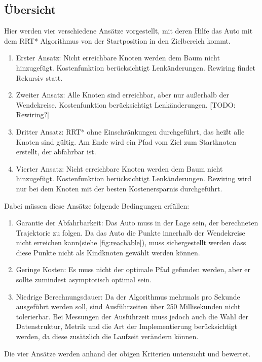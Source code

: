 \subsection{Übersicht}
\label{sec:uebersicht}
Hier werden vier verschiedene Ansätze vorgestellt, mit deren Hilfe das Auto mit dem RRT* Algorithmus von der Startposition in den Zielbereich kommt.
\begin{enumerate}
\item Erster Ansatz: Nicht erreichbare Knoten werden dem Baum nicht hinzugefügt. Kostenfunktion berücksichtigt Lenkänderungen. Rewiring findet Rekursiv statt.
\item Zweiter Ansatz: Alle Knoten sind erreichbar, aber nur außerhalb der Wendekreise. Kostenfunktion berücksichtigt Lenkänderungen. [TODO: Rewiring?]
\item Dritter Ansatz: RRT* ohne Einschränkungen durchgeführt, das heißt alle Knoten sind gültig. Am Ende wird ein Pfad vom Ziel zum Startknoten erstellt, der abfahrbar ist.
\item Vierter Ansatz: Nicht erreichbare Knoten werden dem Baum nicht hinzugefügt. Kostenfunktion berücksichtigt Lenkänderungen. Rewiring wird nur bei dem Knoten mit der besten Kostenersparnis durchgeführt.
\end{enumerate}
Dabei müssen diese Ansätze folgende Bedingungen erfüllen: \\
\begin{enumerate}
\item Garantie der Abfahrbarkeit: Das Auto muss in der Lage sein, der berechneten Trajektorie zu folgen. Da das Auto die Punkte innerhalb der Wendekreise nicht erreichen kann(siehe \ref{fig:reachable}), muss sichergestellt werden dass diese Punkte nicht als Kindknoten gewählt werden können.
\item Geringe Kosten: Es muss nicht der optimale Pfad gefunden werden, aber er sollte zumindest asymptotisch optimal sein. 
\item Niedrige Berechnungsdauer: Da der Algorithmus mehrmals pro Sekunde ausgeführt werden soll, sind Ausführzeiten über 250 Millisekunden nicht tolerierbar. Bei Messungen der Ausführzeit muss jedoch auch die Wahl der Datenstruktur, Metrik und die Art der Implementierung berücksichtigt werden, da diese zusätzlich die Laufzeit verändern können.
\end{enumerate}
Die vier Ansätze werden anhand der obigen Kriterien untersucht und bewertet.


